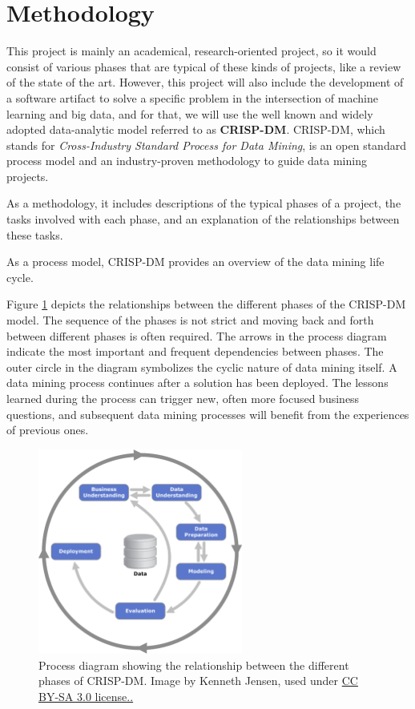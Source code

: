 \section{Methodology}

This project is mainly an academical, research-oriented project, so it would consist of various phases that are typical of these kinds of projects, like a review of the state of the art. However, this project will also include the development of a software artifact to solve a specific problem in the intersection of machine learning and big data, and for that, we will use the well known and widely adopted data-analytic model referred to as \textbf{CRISP-DM}. CRISP-DM, which stands for \textit{Cross-Industry Standard Process for Data Mining}, is an open standard process model and an industry-proven methodology to guide data mining projects.

As a methodology, it includes descriptions of the typical phases of a project, the tasks involved with each phase, and an explanation of the relationships between these tasks.

As a process model, CRISP-DM provides an overview of the data mining life cycle.

Figure \ref{fig:crisp-dm} depicts the relationships between the different phases of the CRISP-DM model. The sequence of the phases is not strict and moving back and forth between different phases is often required. The arrows in the process diagram indicate the most important and frequent dependencies between phases. The outer circle in the diagram symbolizes the cyclic nature of data mining itself. A data mining process continues after a solution has been deployed. The lessons learned during the process can trigger new, often more focused business questions, and subsequent data mining processes will benefit from the experiences of previous ones.

\begin{figure}[hpt]
	\centering
	\includegraphics[width=0.6\textwidth]{figs/ch1/crisp-dm.png}
	\caption{Process diagram showing the relationship between the different phases of CRISP-DM. Image by Kenneth Jensen, used under \href{https://creativecommons.org/licenses/by/2.0/}{CC BY-SA 3.0 license..}}
	\label{fig:crisp-dm}
\end{figure}

